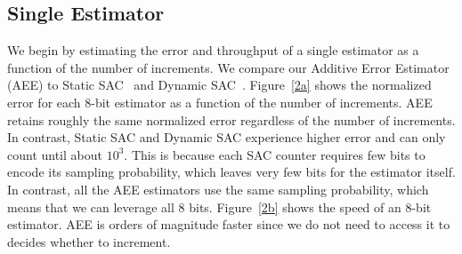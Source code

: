 \subsection{Single Estimator}
We begin by estimating the error and throughput of a single estimator as a function of the number of increments. We compare our Additive Error Estimator (AEE) to Static SAC~\cite{Infocom2019}  and Dynamic SAC~\cite{Infocom2019}. Figure~\ref{2a} shows the normalized error for each 8-bit estimator as a function of the number of increments. 
AEE retains roughly the same normalized error regardless of the number of increments.
In contrast, Static SAC and Dynamic SAC experience higher error and can only count until about $10^3$. 
This is because each SAC counter requires few bits to encode its sampling probability, which leaves very few bits for the estimator itself. 
In contrast, all the AEE estimators use the same sampling probability, which means that we can leverage all 8 bits. Figure~\ref{2b} shows the speed of an 8-bit estimator. AEE is orders of magnitude faster since we do not need to access it to decides whether to increment.  %
